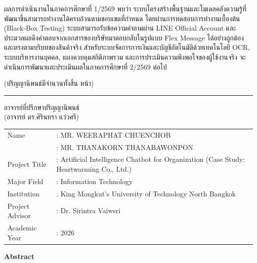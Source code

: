 \hspace*{1.5em}ผลการดำเนินงานในภาคการศึกษาที่ 1/2569 พบว่า ระบบโครงสร้างพื้นฐานและโมเดลคลังความรู้ที่พัฒนาขึ้นสามารถทำงานได้ครบถ้วนตามขอบเขตที่กำหนด โดยผ่านการทดสอบการทำงานเบื้องต้น (Black-Box Testing) ระบบสามารถรับข้อความคำถามผ่าน LINE Official Account และประมวลผลดึงคำตอบจากเอกสารของบริษัทมาตอบกลับในรูปแบบ Flex Message ได้อย่างถูกต้องและตรงตามบริบทของสินค้าจริง สำหรับระบบจัดการการเงินและบัญชีอัตโนมัติด้วยเทคโนโลยี OCR, ระบบบริหารงานบุคคล, แผงควบคุมสถิติภาพรวม และการประเมินความพึงพอใจของผู้ใช้งานจริง จะดำเนินการพัฒนาและประเมินผลในภาคการศึกษาที่ 2/2569 ต่อไป

\vspace{1mm}
\begin{flushright}
(ปริญญานิพนธ์มีจำนวนทั้งสิ้น \pageref{LastPage} หน้า)

\vspace{2mm}
\rule{8 cm}{0.4pt} อาจารย์ที่ปรึกษาปริญญานิพนธ์\\
(อาจารย์ ดร.ศิรินทรา แว่วศรี)
\end{flushright}


\newpage
{}
{}

\vspace*{-0.85in}

{\renewcommand{\arraystretch}{0.75}
\begin{tabularx}{\textwidth}{l L}
Name                    & : MR. WEERAPHAT CHUENCHOB\\
                        & : MR. THANAKORN THANABAWONPON\\
Project Title           & : Artificial Intelligence Chatbot for Organization (Case Study: Heartwarming Co., Ltd.)\\
Major Field             & : Information Technology\\
Institution             & : King Mongkut’s University of Technology North Bangkok\\
Project Advisor         & : Dr. Sirintra Vaiwsri\\
Academic Year           & : 2026\\
\end{tabularx}
}

\vspace{-2mm}
\begin{center}\textbf{Abstract}\end{center}
\vspace{-3mm}

